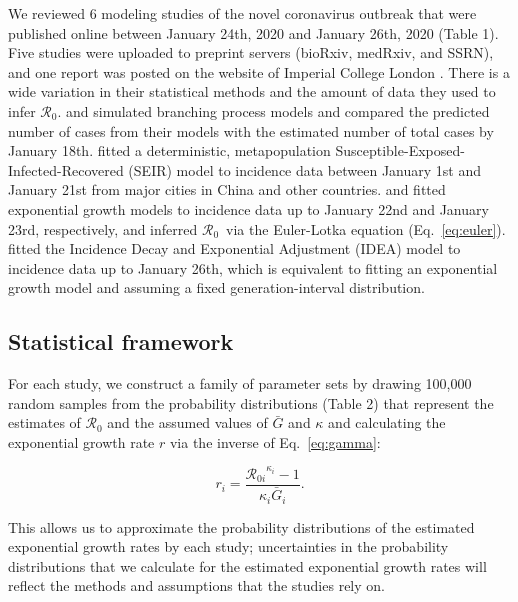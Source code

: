 \documentclass[12pt]{article}
\newcommand{\eref}[1]{Eq.~\ref{eq:#1}}
\newcommand{\Rx}[1]{\ensuremath{{\mathcal R}_{#1}}}
\newcommand{\Ro}{\Rx{0}\xspace}
\begin{document}
We reviewed 6 modeling studies of the novel coronavirus outbreak that were published online between January 24th, 2020 and January 26th, 2020 (Table 1).
Five studies \citep{liuncov, majumderncov, readncov, riouncov, zhaoncov} were uploaded to preprint servers (bioRxiv, medRxiv, and SSRN), and one report was posted on the website of Imperial College London \citep{imaincov}.
There is a wide variation in their statistical methods and the amount of data they used to infer \Ro.
\cite{imaincov} and \cite{riouncov} simulated branching process models and compared the predicted number of cases from their models with the estimated number of total cases by January 18th.
\cite{readncov} fitted a deterministic, metapopulation Susceptible-Exposed-Infected-Recovered (SEIR) model to incidence data between January 1st and January 21st from major cities in China and other countries.
\cite{zhaoncov} and \cite{liuncov} fitted exponential growth models to incidence data up to January 22nd and January 23rd, respectively, and inferred \Ro\ via the Euler-Lotka equation (\eref{euler}).
\cite{majumderncov} fitted the Incidence Decay and Exponential Adjustment (IDEA) model \citep{fisman2013idea} to incidence data up to January 26th, which is equivalent to fitting an exponential growth model and assuming a fixed generation-interval distribution.

\subsection{Statistical framework}

For each study, we construct a family of parameter sets by drawing 100,000 random samples from the probability distributions (Table 2) that represent the estimates of \Ro and the assumed values of $\bar G$ and $\kappa$ and calculating the exponential growth rate $r$ via the inverse of \eref{gamma}:
\begin{linenomath*}
\begin{equation}
r_i = \frac{{\mathcal R_{0i}}^{\kappa_i} - 1}{\kappa_i \bar{G}_i}.
\end{equation}
\end{linenomath*}
This allows us to approximate the probability distributions of the estimated exponential growth rates by each study;
uncertainties in the probability distributions that we calculate for the estimated exponential growth rates will reflect the methods and assumptions that the studies rely on.
\end{document}
